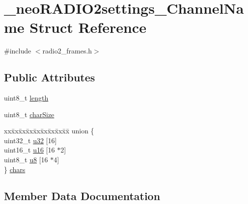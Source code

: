 \hypertarget{struct__neo_r_a_d_i_o2settings___channel_name}{}\section{\+\_\+neo\+R\+A\+D\+I\+O2settings\+\_\+\+Channel\+Name Struct Reference}
\label{struct__neo_r_a_d_i_o2settings___channel_name}


{\ttfamily \#include $<$radio2\+\_\+frames.\+h$>$}

\subsection*{Public Attributes}
\begin{DoxyCompactItemize}
\item 
uint8\+\_\+t \mbox{\hyperlink{struct__neo_r_a_d_i_o2settings___channel_name_aeddd580a7cdd2752ea0ef02516b4f3a4}{length}}
\item 
uint8\+\_\+t \mbox{\hyperlink{struct__neo_r_a_d_i_o2settings___channel_name_acfa908be55c8b37d2d1124043ce04c0f}{char\+Size}}
\item 
\begin{tabbing}
xx\=xx\=xx\=xx\=xx\=xx\=xx\=xx\=xx\=\kill
union \{\\
\>uint32\_t \mbox{\hyperlink{struct__neo_r_a_d_i_o2settings___channel_name_a25d397cea8fb069bc02d980a0583bb4a}{u32}} \mbox{[}16\mbox{]}\\
\>uint16\_t \mbox{\hyperlink{struct__neo_r_a_d_i_o2settings___channel_name_ac45036c27aa797f7ab94bb1f91278b26}{u16}} \mbox{[}16 $\ast$2\mbox{]}\\
\>uint8\_t \mbox{\hyperlink{struct__neo_r_a_d_i_o2settings___channel_name_af4ec4683111a0066d77bdf1aa3e51381}{u8}} \mbox{[}16 $\ast$4\mbox{]}\\
\} \mbox{\hyperlink{struct__neo_r_a_d_i_o2settings___channel_name_a046e9f87d040db9b7f7ec0305015c2b2}{chars}}\\

\end{tabbing}\end{DoxyCompactItemize}


\subsection{Member Data Documentation}
\mbox{\label{struct__neo_r_a_d_i_o2settings___channel_name_a046e9f87d040db9b7f7ec0305015c2b2}} 
